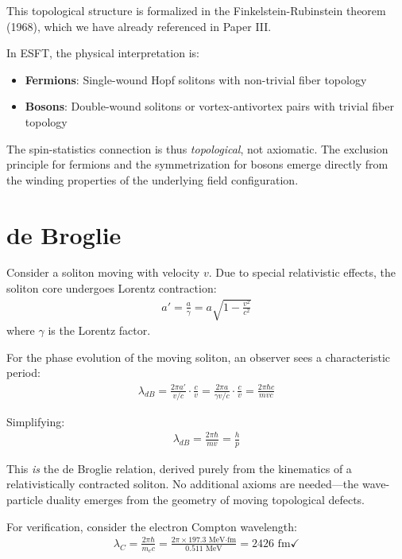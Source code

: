 ﻿\documentclass[twocolumn,showpacs,preprintnumbers,amsmath,amssymb,prd]{revtex4-2}
\begin{document}
This topological structure is formalized in the Finkelstein-Rubinstein theorem (1968), which we have already referenced in Paper III.

In ESFT, the physical interpretation is:
\begin{itemize}
\item \textbf{Fermions}: Single-wound Hopf solitons with non-trivial fiber topology
\item \textbf{Bosons}: Double-wound solitons or vortex-antivortex pairs with trivial fiber topology
\end{itemize}

The spin-statistics connection is thus \emph{topological}, not axiomatic. The exclusion principle for fermions and the symmetrization for bosons emerge directly from the winding properties of the underlying field configuration.

\section{de Broglie}

Consider a soliton moving with velocity $v$. Due to special relativistic effects, the soliton core undergoes Lorentz contraction:
\begin{align}
a' = \frac{a}{\gamma} = a\sqrt{1 - \frac{v^2}{c^2}}
\end{align}
where $\gamma$ is the Lorentz factor.

For the phase evolution of the moving soliton, an observer sees a characteristic period:
\begin{align}
\lambda_{dB} = \frac{2\pi a'}{v/c} \cdot \frac{c}{v} = \frac{2\pi a}{\gamma v/c} \cdot \frac{c}{v} = \frac{2\pi\hbar c}{mvc}
\end{align}

Simplifying:
\begin{align}
\lambda_{dB} = \frac{2\pi\hbar}{mv} = \frac{h}{p}
\end{align}

This \emph{is} the de Broglie relation, derived purely from the kinematics of a relativistically contracted soliton. No additional axioms are needed---the wave-particle duality emerges from the geometry of moving topological defects.

For verification, consider the electron Compton wavelength:
\begin{align}
\lambda_C = \frac{2\pi\hbar}{m_e c} = \frac{2\pi \times 197.3 \text{ MeV·fm}}{0.511 \text{ MeV}} = 2426 \text{ fm} \checkmark
\end{align}
\end{document}
